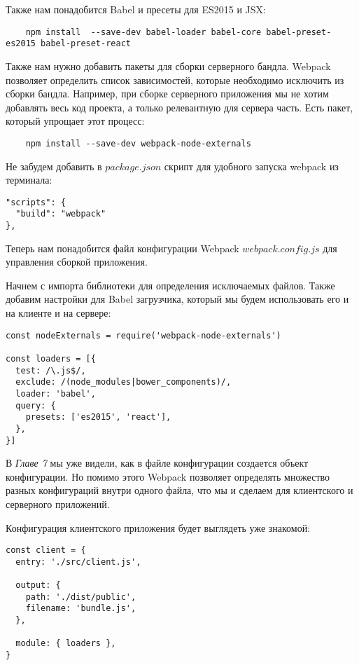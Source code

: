 Также нам понадобится Babel и пресеты для ES2015 и JSX:

\begin{lstlisting}
	npm install  --save-dev babel-loader babel-core babel-preset-es2015 babel-preset-react
\end{lstlisting}

Также нам нужно добавить пакеты для сборки серверного бандла. 
Webpack позволяет определить список зависимостей, которые необходимо исключить из сборки бандла. Например, при сборке серверного приложения мы не хотим добавлять весь код проекта, а только релевантную для сервера часть. Есть пакет, который упрощает этот процесс:

\begin{lstlisting}
	npm install --save-dev webpack-node-externals
\end{lstlisting}

Не забудем добавить в $package.json$ скрипт для удобного запуска webpack из терминала:

\begin{lstlisting}
"scripts": {
  "build": "webpack"
},
\end{lstlisting}

Теперь нам понадобится файл конфигурации Webpack $webpack.config.js$ для управления сборкой приложения.

Начнем с импорта библиотеки для определения исключаемых файлов. Также добавим настройки для Babel загрузчика, который мы будем использовать его и на клиенте и на сервере:

\begin{lstlisting}
const nodeExternals = require('webpack-node-externals')

const loaders = [{
  test: /\.js$/,
  exclude: /(node_modules|bower_components)/,
  loader: 'babel',
  query: {
    presets: ['es2015', 'react'],
  },
}]
\end{lstlisting}

В \textit{Главе 7} мы уже видели, как в файле конфигурации создается объект конфигурации. Но помимо этого Webpack позволяет определять множество разных конфигураций внутри одного файла, что мы и сделаем для клиентского и серверного приложений.

Конфигурация клиентского приложения будет выглядеть уже знакомой:

\begin{lstlisting}
const client = {
  entry: './src/client.js',
  
  output: {
    path: './dist/public',
    filename: 'bundle.js',
  },
  
  module: { loaders },
}
\end{lstlisting}

